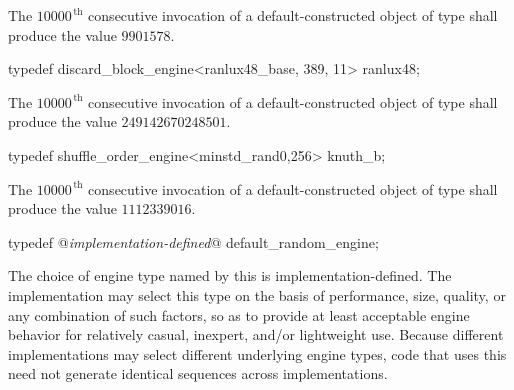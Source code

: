 \begin{itemdescr}
\pnum\required
 The $10000^{\,\mathrm{th}}$ consecutive invocation
 of a default-constructed object
 of type 
 shall produce the value
 $ 9901578 $.
\end{itemdescr}

%
%
\begin{itemdecl}
typedef discard_block_engine<ranlux48_base, 389, 11>
       ranlux48;
\end{itemdecl}

\begin{itemdescr}
\pnum\required
 The $10000^{\,\mathrm{th}}$ consecutive invocation
 of a default-constructed object
 of type 
 shall produce the value
 $ 249142670248501 $.
\end{itemdescr}

%
%
\begin{itemdecl}
typedef shuffle_order_engine<minstd_rand0,256>
       knuth_b;
\end{itemdecl}

\begin{itemdescr}
\pnum\required
 The $10000^{\,\mathrm{th}}$ consecutive invocation
 of a default-constructed object
 of type 
 shall produce the value $1112339016$.
\end{itemdescr}%

%
%
\begin{itemdecl}
typedef @\textit{implementation-defined}@
       default_random_engine;
\end{itemdecl}

\begin{itemdescr}
\pnum\note
The choice of engine type
named by this 
is implementation-defined.
\enternote
 The implementation
 may select this type
 on the basis of performance,
 size,
 quality,
 or any combination of such factors,
 so as to provide at least acceptable engine behavior
 for relatively casual, inexpert, and/or lightweight use.
 Because different implementations
 may select different underlying engine types,
 code that uses this 
 need not generate identical sequences across implementations.
\exitnote
\end{itemdescr}%
%
%



